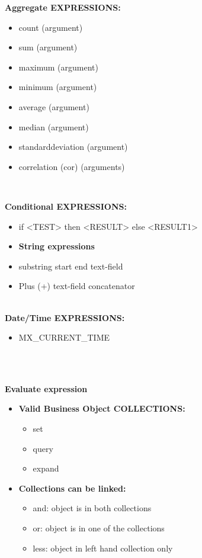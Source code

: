 \documentclass[11pt,twoside,a4paper]{article}
\begin{document}
\begin{minipage}[ht]{0.48\textwidth}

	\textbf{Aggregate EXPRESSIONS:}
	\begin{itemize}
		\item count (argument)
		\item sum (argument)
		\item maximum (argument)
		\item minimum (argument)
		\item average (argument)
		\item median (argument)
		\item standarddeviation   (argument)
		\item correlation (cor) (arguments)
	\end{itemize}~\\

\end{minipage} \hfill \begin{minipage}[ht]{0.48\textwidth}

	\textbf{Conditional EXPRESSIONS:}
	\begin{itemize}
		\item if <TEST> then <RESULT> else <RESULT1>
		\item[] \textbf{String expressions}
		\item substring start end text-field
		\item Plus (+) text-field concatenator
	\end{itemize}~\\
	 
	\textbf{Date/Time EXPRESSIONS:}
	\begin{itemize}
		\item MX\_CURRENT\_TIME
	\end{itemize}~\\

\end{minipage}~\\

\textbf{Evaluate expression}
\begin{itemize}
	\item[] \textbf{Valid Business Object COLLECTIONS:}
	\begin{itemize}
		\item set
		\item query
		\item expand
	\end{itemize}
	\item[] \textbf{Collections can be linked:}
	\begin{itemize}
		\item and: object is in both collections
		\item or: object is in one of the collections
		\item less: object in left hand collection only
	\end{itemize}
\end{itemize}~\\
		
\end{document}
